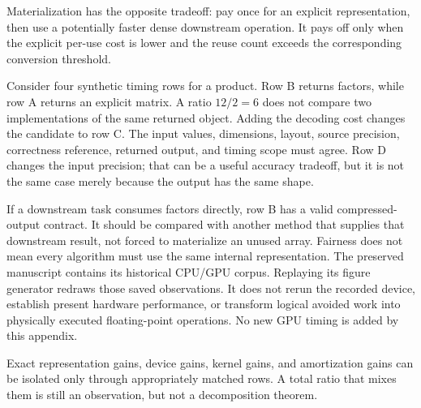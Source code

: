 Materialization has the opposite tradeoff: pay once for an explicit representation, then use a potentially faster dense downstream operation. It pays off only when the explicit per-use cost is lower and the reuse count exceeds the corresponding conversion threshold.

Consider four synthetic timing rows for a product. Row B returns factors, while row A returns an explicit matrix. A ratio $12/2=6$ does not compare two implementations of the same returned object. Adding the decoding cost changes the candidate to row C.
The input values, dimensions, layout, source precision, correctness reference, returned output, and timing scope must agree. Row D changes the input precision; that can be a useful accuracy tradeoff, but it is not the same case merely because the output has the same shape.

If a downstream task consumes factors directly, row B has a valid compressed-output contract. It should be compared with another method that supplies that downstream result, not forced to materialize an unused array. Fairness does not mean every algorithm must use the same internal representation.
The preserved manuscript contains its historical CPU/GPU corpus. Replaying its figure generator redraws those saved observations. It does not rerun the recorded device, establish present hardware performance, or transform logical avoided work into physically executed floating-point operations. No new GPU timing is added by this appendix.

Exact representation gains, device gains, kernel gains, and amortization gains can be isolated only through appropriately matched rows. A total ratio that mixes them is still an observation, but not a decomposition theorem.

